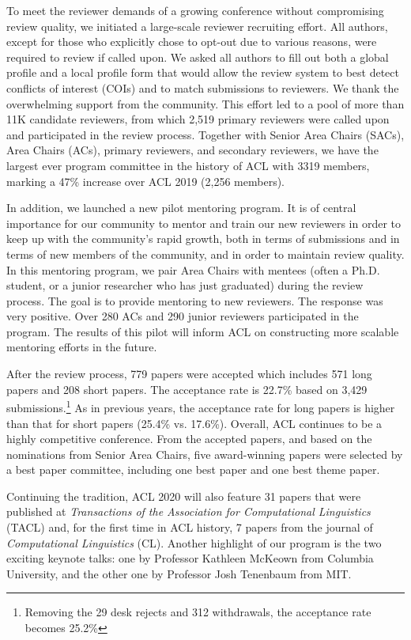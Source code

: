 \documentclass[11pt]{article}
\begin{document}
To meet the reviewer demands of a growing conference without compromising review quality, we initiated a large-scale reviewer recruiting effort.  All authors, except for those who explicitly chose to opt-out due to various reasons,  were required to review if called upon. We asked all authors to fill out both a global profile and a local profile form that would allow the review system to best detect conflicts of interest (COIs) and to match submissions to reviewers. We thank the overwhelming support from the community. This effort led to a pool of more than 11K candidate reviewers, from which 2,519 primary reviewers were called upon and participated in the review process.  Together with Senior Area Chairs (SACs), Area Chairs (ACs), primary reviewers, and secondary reviewers, we have the  largest ever program committee in the history of ACL with 3319 members,  marking a 47\% increase over ACL 2019 (2,256 members).

In addition, we launched a new pilot mentoring program.  It is of central importance for our community to mentor and train our new reviewers in order to keep up with the community's rapid growth, both in terms of submissions and in terms of new members of the community, and in order to maintain review quality.  In this mentoring program, we pair Area Chairs with mentees (often a Ph.D. student, or a junior researcher who has just graduated) during the review process. The goal is to provide
 mentoring to new reviewers. The response was very positive. Over 280  ACs and 290  junior reviewers  participated in the program.   The results of this pilot will inform ACL on constructing more scalable mentoring efforts in the future.

After the review process, 779 papers were accepted which includes  571 long papers and 208 short papers. The acceptance rate is  22.7\% based on 3,429 submissions.\footnote{Removing the 29 desk rejects and 312 withdrawals, the acceptance rate becomes 25.2\%} As in previous years, the acceptance rate for long papers is higher than that for short papers (25.4\% vs. 17.6\%). Overall, ACL continues to be a highly competitive conference. From the accepted papers, and based on the nominations from Senior Area Chairs, five award-winning papers were selected by a best paper committee, including one best paper and one best theme paper.

Continuing the tradition, ACL 2020 will also feature 31 papers that were published at {\em Transactions of the Association for Computational Linguistics} (TACL) and, for the first time in ACL history, 7 papers from the journal of {\em Computational Linguistics} (CL).  Another highlight of our program is the two exciting keynote talks: one by Professor Kathleen McKeown from Columbia University, and the other one by Professor Josh Tenenbaum from MIT. 
\end{document}
